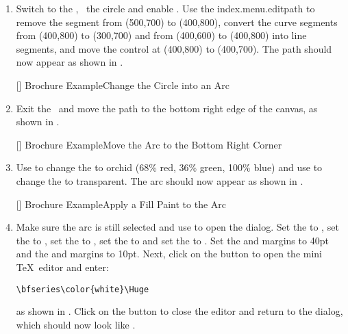 \begin{enumerate}
[]
{}
{Brochure Example\dash Draw a Circle}

\item Switch to the , \select\ the circle and enable
\editpathmode. Use the \gls{index.menu.editpath} to remove the
segment from (500,700) to (400,800), convert the curve segments from
(400,800) to (300,700) and from (400,600) to (400,800) into line
segments, and move the control at (400,800) to (400,700). The
\gls{path} should now appear as shown in .

[]
{}
{Brochure Example\dash Change the Circle into an Arc}

\item Exit the \editpathmode\ and move the \gls*{path} to the bottom
right edge of the \gls{canvas}, as shown in
.

[]
{}
{Brochure Example\dash Move the Arc to the Bottom Right Corner}

\item Use  to change the 
 to orchid (68\% red, 36\% green, 100\% blue) and use
 to change the 
to \gls{transparent}. The arc should now appear as shown in
.

[]
{}
{Brochure Example\dash Apply a Fill Paint to the Arc}

\item Make sure the arc is still selected and
use  to open the
 dialog. Set the
 to
, set the
 to , set the
 to
,
set the  to
 and set the
 to
.  Set the
 and
 margins to 40\gls{pt} and the
 and
 margins to 10\gls{pt}.
Next, click on the  button to open
the mini \TeX\ editor and enter:
\begin{verbatim}
\bfseries\color{white}\Huge
\end{verbatim}
as shown in . Click on the
 button to close the editor and return to the
 dialog, which should now look like
.


\end{enumerate}

